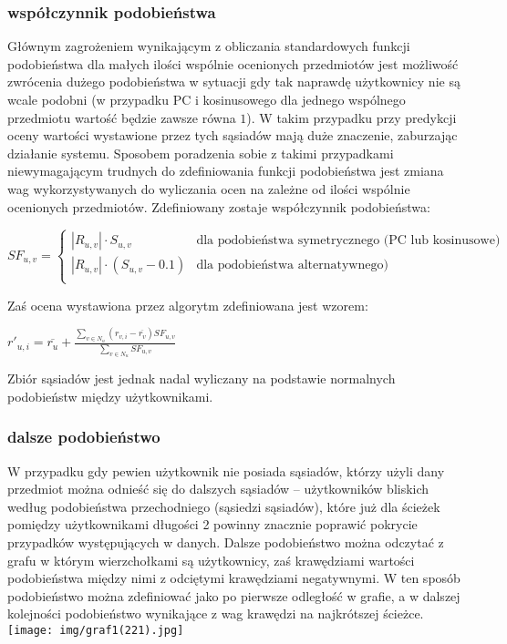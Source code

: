 \documentclass{pracamgr}
\begin{document}
    \subsubsection{współczynnik podobieństwa}
     Głównym zagrożeniem wynikającym z obliczania standardowych funkcji podobieństwa dla małych ilości wspólnie ocenionych przedmiotów jest możliwość
     zwrócenia dużego podobieństwa w sytuacji gdy tak naprawdę użytkownicy nie są wcale podobni
     (w przypadku PC i kosinusowego dla jednego wspólnego przedmiotu wartość będzie zawsze równa $1$).
     W takim przypadku przy predykcji oceny wartości wystawione przez tych sąsiadów mają duże znaczenie, zaburzając działanie systemu.
     Sposobem poradzenia sobie z takimi przypadkami niewymagającym trudnych do zdefiniowania funkcji podobieństwa jest zmiana wag
     wykorzystywanych do wyliczania ocen na zależne od ilości wspólnie ocenionych przedmiotów.
     Zdefiniowany zostaje współczynnik podobieństwa:
     \begin{center}
      $SF_{u,v}=\left\{\begin{array}{cc}
       |R_{u,v}|\cdot S_{u,v}&\text{dla podobieństwa symetrycznego (PC lub kosinusowe)}\\
       |R_{u,v}|\cdot(S_{u,v}-0.1)&\text{dla podobieństwa alternatywnego)}\\
      \end{array}\right.$
     \end{center}
     Zaś ocena wystawiona przez algorytm zdefiniowana jest wzorem:
     \begin{center}
     $r'_{u,i}=\overline{r_{u}}+\frac{\sum\limits_{v\in N_u}(r_{v,i}-\overline{r_v})SF_{u,v}}{\sum\limits_{v\in N_u}SF_{u,v}}$
     \end{center}
     Zbiór sąsiadów jest jednak nadal wyliczany na podstawie normalnych podobieństw między użytkownikami.
    \subsubsection{dalsze podobieństwo}
     W przypadku gdy pewien użytkownik nie posiada sąsiadów, którzy użyli dany przedmiot %
     można odnieść się do dalszych sąsiadów -- użytkowników bliskich według podobieństwa przechodniego (sąsiedzi sąsiadów),
     które już dla ścieżek pomiędzy użytkownikami długości 2 powinny znacznie poprawić pokrycie przypadków występujących w danych.%
     Dalsze podobieństwo można odczytać z grafu w którym wierzchołkami są użytkownicy, zaś krawędziami wartości podobieństwa między nimi z odciętymi krawędziami
     negatywnymi. W ten sposób podobieństwo można zdefiniować jako po pierwsze odległość w grafie, a w dalszej kolejności podobieństwo wynikające z wag krawędzi
     na najkrótszej ścieżce.\newline
     \texttt{[image: img/graf1(221).jpg]}\newline
\end{document}
